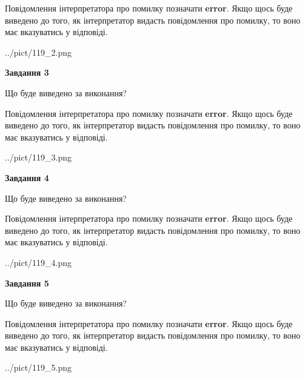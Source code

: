 \documentclass[12pt, ukrainian]{article}
\begin{document}
{\begin {large}
Повідомлення інтерпретатора про помилку позначати \textbf{error}.
Якщо щось буде виведено до того, як інтерпретатор видасть повідомлення про помилку, 
то воно має вказуватись у відповіді. \par


\begin{center}
	{../pict/119_2.png}
\end{center}
\newpage

{\begin {center}\textbf{Завдання 3}\end {center}}\par
Що буде виведено за виконання?

Повідомлення інтерпретатора про помилку позначати \textbf{error}.
Якщо щось буде виведено до того, як інтерпретатор видасть повідомлення про помилку, 
то воно має вказуватись у відповіді. \par


\begin{center}
	{../pict/119_3.png}
\end{center}
\newpage

{\begin {center}\textbf{Завдання 4}\end {center}}\par
Що буде виведено за виконання?

Повідомлення інтерпретатора про помилку позначати \textbf{error}.
Якщо щось буде виведено до того, як інтерпретатор видасть повідомлення про помилку, 
то воно має вказуватись у відповіді. \par


\begin{center}
	{../pict/119_4.png}
\end{center}
\newpage

{\begin {center}\textbf{Завдання 5}\end {center}}\par
Що буде виведено за виконання?

Повідомлення інтерпретатора про помилку позначати \textbf{error}.
Якщо щось буде виведено до того, як інтерпретатор видасть повідомлення про помилку, 
то воно має вказуватись у відповіді. \par


\begin{center}
	{../pict/119_5.png}
\end{center}
\newpage


\end{large}}
\end{document}
